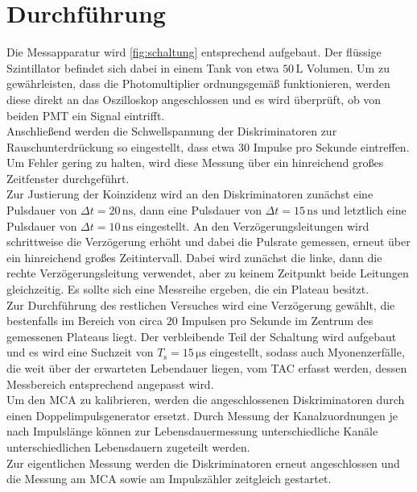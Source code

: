 \section{Durchführung}
\label{sec:Durchführung}

Die Messapparatur wird \autoref{fig:schaltung} entsprechend aufgebaut.
Der flüssige Szintillator befindet sich dabei in einem Tank von etwa $50 \,\unit{\liter}$ Volumen.
Um zu gewährleisten, dass die Photomultiplier ordnungsgemäß funktionieren, werden diese direkt an das Oszilloskop angeschlossen und es wird überprüft, ob von beiden PMT ein Signal eintrifft. \\

Anschließend werden die Schwellspannung der Diskriminatoren zur Rauschunterdrückung so eingestellt, dass etwa $30$ Impulse pro Sekunde eintreffen.
Um Fehler gering zu halten, wird diese Messung über ein hinreichend großes Zeitfenster durchgeführt. \\

Zur Justierung der Koinzidenz wird an den Diskriminatoren zunächst eine Pulsdauer von $\Delta t = 20 \,\unit{\nano\second}$, dann eine Pulsdauer von $\Delta t = 15 \,\unit{\nano\second}$ und letztlich eine
Pulsdauer von $\Delta t = 10 \,\unit{\nano\second}$ eingestellt.
An den Verzögerungsleitungen wird schrittweise die Verzögerung erhöht und dabei die Pulsrate gemessen, erneut über ein hinreichend großes Zeitintervall.
Dabei wird zunächst die linke, dann die rechte Verzögerungsleitung verwendet, aber zu keinem Zeitpunkt beide Leitungen gleichzeitig.
Es sollte sich eine Messreihe ergeben, die ein Plateau besitzt. \\

Zur Durchführung des restlichen Versuches wird eine Verzögerung gewählt, die bestenfalls im Bereich von circa $20$ Impulsen pro Sekunde im Zentrum des gemessenen Plateaus liegt.
Der verbleibende Teil der Schaltung wird aufgebaut und es wird eine Suchzeit von $T_\text{s} = 15 \,\unit{\micro\second}$ eingestellt, sodass auch Myonenzerfälle, die weit über der erwarteten Lebendauer
liegen, vom TAC erfasst werden, dessen Messbereich entsprechend angepasst wird. \\

Um den MCA zu kalibrieren, werden die angeschlossenen Diskriminatoren durch einen Doppelimpulsgenerator ersetzt.
Durch Messung der Kanalzuordnungen je nach Impulslänge können zur Lebensdauermessung unterschiedliche Kanäle unterschiedlichen Lebensdauern zugeteilt werden. \\

Zur eigentlichen Messung werden die Diskriminatoren erneut angeschlossen und die Messung am MCA sowie am Impulszähler zeitgleich gestartet.




